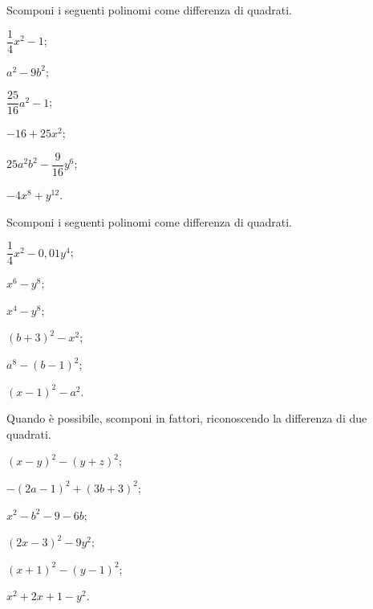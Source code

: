 \begin{esercizio}
\label{ese:13.64}
Scomponi i seguenti polinomi come differenza di quadrati.
\begin{multicols}{3}
\begin{enumeratea}
 \item $\dfrac{1}{4}x^{2}-1$;
 \item $a^{2}-9b^{2}$;
 \item $\dfrac{25}{16}a^{2}-1$;
 \item $-16+25x^{2}$;
 \item $25a^{2}b^{2}-\dfrac{9}{16}y^{6}$;
 \item $-4x^{8}+y^{12}$.
\end{enumeratea}
\end{multicols}
\end{esercizio}

\begin{esercizio}[\Ast]
\label{ese:13.65}
Scomponi i seguenti polinomi come differenza di quadrati.
\begin{multicols}{3}
\begin{enumeratea}
 \item $\dfrac{1}{4}x^{2}-0,01y^{4}$;
 \item $x^{6}-y^{8}$;
 \item $x^{4}-y^{8}$;
 \item $(b+3)^{2}-x^{2}$;
 \item $a^{8}-(b-1)^{2}$;
 \item $(x-1)^{2}-a^{2}$.
\end{enumeratea}
\end{multicols}
\end{esercizio}

\begin{esercizio}[\Ast]
\label{ese:13.66}
Quando è possibile, scomponi in fattori, riconoscendo la differenza di due quadrati.
\begin{multicols}{3}
\begin{enumeratea}
 \item $(x-y)^{2}-(y+z)^{2}$;
 \item $-(2a-1)^{2}+(3b+3)^{2}$;
 \item $x^{2}-b^{2}-9-6b$;
 \item $(2x-3)^{2}-9y^{2}$;
 \item $(x+1)^{2}-(y-1)^{2}$;
 \item $x^{2}+2x+1-y^{2}$.
\end{enumeratea}
\end{multicols}
\end{esercizio}

